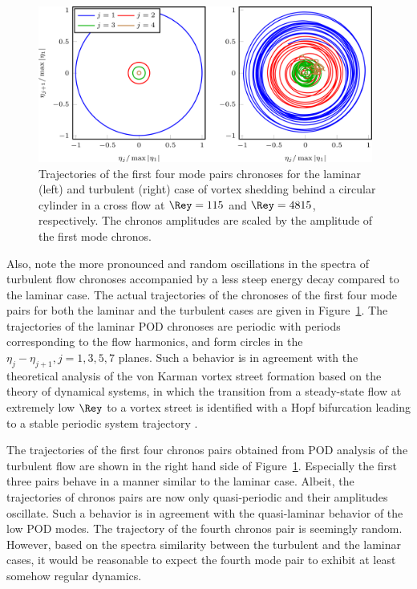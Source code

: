 \begin{figure}[tbp]
    \centering
    \includegraphics[width=0.98\textwidth]{02_images/00_export/figure28.png}
    \caption{Trajectories of the first four mode pairs chronoses for the laminar (left) and turbulent (right) case of vortex shedding behind a circular cylinder in a cross flow at $\Rey = 115$ and $\Rey = 4815$, respectively. The chronos amplitudes are scaled by the amplitude of the first mode chronos.}
    \label{fig:appEtasLam}
\end{figure}
Also, note the more pronounced and random oscillations in the spectra of turbulent flow chronoses accompanied by a less steep energy decay  compared to the laminar case. The actual trajectories of the chronoses of the first four mode pairs for both the laminar and the turbulent cases are given in Figure~\ref{fig:appEtasLam}. The trajectories of the laminar POD chronoses are periodic with periods corresponding to the flow harmonics, and form circles in the $\eta_{j}-\eta_{j+1}, j = 1,3,5,7$ planes. Such a behavior is in agreement with the theoretical analysis of the von Karman vortex street formation based on the theory of dynamical systems, in which the transition from a steady-state flow at extremely low $\Rey$ to a vortex street is identified with a Hopf bifurcation leading to a stable periodic system trajectory \cite{williamson1996}.

The trajectories of the first four chronos pairs obtained from POD analysis of the turbulent flow are shown in the right hand side of Figure~\ref{fig:appEtasLam}. Especially the first three pairs behave in a manner similar to the laminar case. Albeit, the trajectories of chronos pairs are now only quasi-periodic and their amplitudes oscillate. Such a behavior is in agreement with the quasi-laminar behavior of the low POD modes. The trajectory of the fourth chronos pair is seemingly random. However, based on the spectra similarity between the turbulent and the laminar cases, it would be reasonable to expect the fourth mode pair to exhibit at least somehow regular dynamics.


